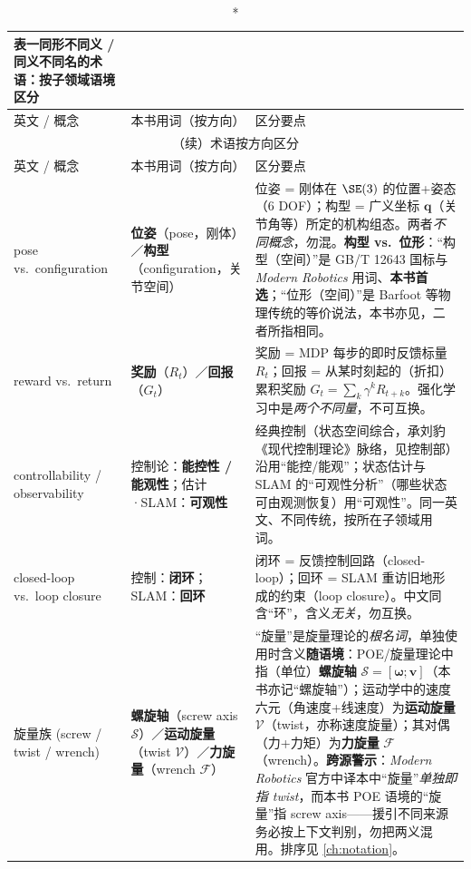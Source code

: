 \begin{center}\small
\begin{longtable}{p{} p{} p{}}
\caption*{\textbf{表一}\quad 同形不同义 / 同义不同名的术语：按子领域语境区分}\\
\toprule
英文 / 概念 & 本书用词（按方向） & 区分要点 \\
\midrule
\endfirsthead
\multicolumn{3}{c}{\small（续）术语按方向区分}\\
\toprule
英文 / 概念 & 本书用词（按方向） & 区分要点 \\
\midrule
\endhead
\bottomrule
\endfoot
pose vs.\ configuration
  & \textbf{位姿}（pose，刚体）／\textbf{构型}（configuration，关节空间）
  & 位姿 = 刚体在 $\SE(3)$ 的位置+姿态（6 DOF）；构型 = 广义坐标 $\mathbf{q}$（关节角等）所定的机构组态。两者\emph{不同概念}，勿混。\textbf{构型 vs.\ 位形}：“构型（空间）”是 GB/T 12643 国标与 \emph{Modern Robotics} 用词、\textbf{本书首选}；“位形（空间）”是 Barfoot 等物理传统的等价说法，本书亦见，二者所指相同。\\
reward vs.\ return
  & \textbf{奖励}（$R_t$）／\textbf{回报}（$G_t$）
  & 奖励 = MDP 每步的即时反馈标量 $R_t$；回报 = 从某时刻起的（折扣）累积奖励 $G_t=\sum_k\gamma^k R_{t+k}$。强化学习中是\emph{两个不同量}，不可互换。\\
controllability / observability
  & 控制论：\textbf{能控性 / 能观性}；估计·SLAM：\textbf{可观性}
  & 经典控制（状态空间综合，承刘豹《现代控制理论》脉络，见控制部）沿用“能控/能观”；状态估计与 SLAM 的“可观性分析”（哪些状态可由观测恢复）用“可观性”。同一英文、不同传统，按所在子领域用词。\\
closed-loop vs.\ loop closure
  & 控制：\textbf{闭环}；SLAM：\textbf{回环}
  & 闭环 = 反馈控制回路（closed-loop）；回环 = SLAM 重访旧地形成的约束（loop closure）。中文同含“环”，含义\emph{无关}，勿互换。\\
旋量族 (screw / twist / wrench)
  & \textbf{螺旋轴}（screw axis $\mathcal{S}$）／\textbf{运动旋量}（twist $\mathcal{V}$）／\textbf{力旋量}（wrench $\mathcal{F}$）
  & “旋量”是旋量理论的\emph{根名词}，单独使用时含义\textbf{随语境}：POE/旋量理论中指（单位）\textbf{螺旋轴} $\mathcal{S}=[\boldsymbol{\omega};\mathbf{v}]$（本书亦记“螺旋轴”）；运动学中的速度六元（角速度+线速度）为\textbf{运动旋量} $\mathcal{V}$（twist，亦称速度旋量）；其对偶（力+力矩）为\textbf{力旋量} $\mathcal{F}$（wrench）。\textbf{跨源警示}：\emph{Modern Robotics} 官方中译本中“旋量”\emph{单独即指 twist}，而本书 POE 语境的“旋量”指 screw axis——援引不同来源务必按上下文判别，勿把两义混用。排序见 \cref{ch:notation}。\\

\end{longtable}
\end{center}
